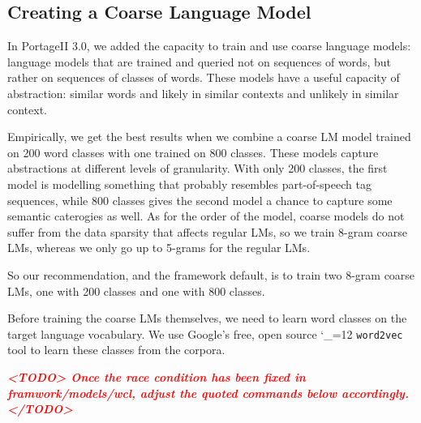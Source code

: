 \documentclass[11pt,letterpaper]{article}
\newcommand{\TODO}[1]{\emph{\textbf{\textcolor{red}{<TODO> #1 </TODO>}}}}
\newcommand{\PS}{PortageII\xspace}
\def\code{\begingroup\catcode`\_=12 \codex}
\newcommand{\codex}[1]{\texttt{#1}\endgroup}
\begin{document}
\subsection{Creating a Coarse Language Model} \label{coarseLM}

In \PS 3.0, we added the capacity to train and use coarse language models:
language models that are trained and queried not on sequences of words, but
rather on sequences of classes of words. These models have a useful capacity of
abstraction: similar words and likely in similar contexts and unlikely in
similar context.

Empirically, we get the best results when we combine a coarse LM model trained
on 200 word classes with one trained on 800 classes. These models capture
abstractions at different levels of granularity. With only 200 classes, the
first model is modelling something that probably resembles part-of-speech tag
sequences, while 800 classes gives the second model a chance to capture some
semantic caterogies as well. As for the order of the model, coarse models do
not suffer from the data sparsity that affects regular LMs, so we train 8-gram
coarse LMs, whereas we only go up to 5-grams for the regular LMs.

So our recommendation, and the framework default, is to train two 8-gram coarse
LMs, one with 200 classes and one with 800 classes.

Before training the coarse LMs themselves, we need to learn word classes on the
target language vocabulary. We use Google's free, open source \code{word2vec}
tool to learn these classes from the corpora.

\TODO{Once the race condition has been fixed in framwork/models/wcl, adjust the
quoted commands below accordingly.}
\end{document}
